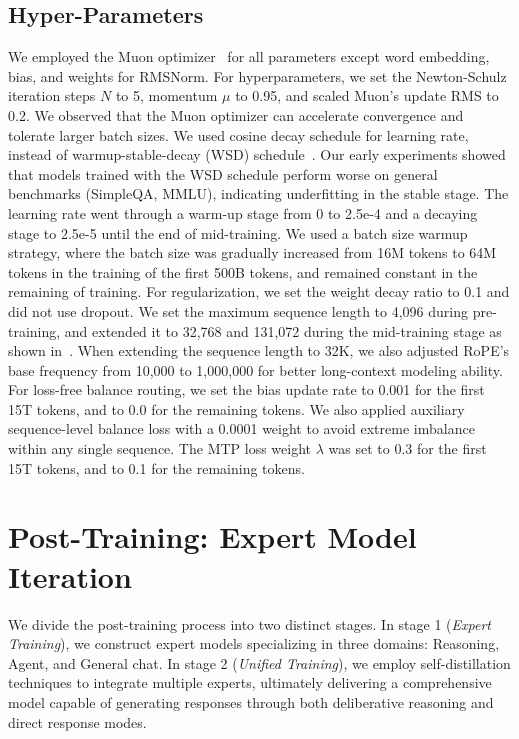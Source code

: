 \documentclass{article}
\theoremstyle{definition}
\begin{document}
\subsection{Hyper-Parameters}

We employed the Muon optimizer~\cite{jordan6muon,liu2025muon} for all parameters except word embedding, bias, and weights for RMSNorm. For hyperparameters, we set the Newton-Schulz iteration steps $N$ to 5, momentum $\mu$ to 0.95, and scaled Muon's update RMS to 0.2. We observed that the Muon optimizer can accelerate convergence and tolerate larger batch sizes. We used cosine decay schedule for learning rate, instead of warmup-stable-decay (WSD) schedule~\cite{huminicpm}. Our early experiments showed that models trained with the WSD schedule perform worse on general benchmarks (SimpleQA, MMLU), indicating underfitting in the stable stage. The learning rate went through a warm-up stage from 0 to 2.5e-4 and a decaying stage to 2.5e-5 until the end of mid-training. We used a batch size warmup strategy, where the batch size was gradually increased from 16M tokens to 64M tokens in the training of the first 500B tokens, and remained constant in the remaining of training. 
For regularization, we set the weight decay ratio to 0.1 and did not use dropout. We set the maximum sequence length to 4,096 during pre-training, and extended it to 32,768 and 131,072 during the mid-training stage as shown in~. When extending the sequence length to 32K, we also adjusted RoPE's base frequency from 10,000 to 1,000,000 for better long-context modeling ability. For loss-free balance routing, we set the bias update rate to 0.001 for the first 15T tokens, and to 0.0 for the remaining tokens. We also applied auxiliary sequence-level balance loss with a 0.0001 weight to avoid extreme imbalance within any single sequence. The MTP loss weight $\lambda$ was set to 0.3 for the first 15T tokens, and to 0.1 for the remaining tokens.

\section{Post-Training: Expert Model Iteration}

We divide the post-training process into two distinct stages. In stage 1 (\emph{Expert Training}), we construct expert models specializing in three domains: Reasoning, Agent, and General chat. In stage 2 (\emph{Unified Training}), we employ self-distillation techniques to integrate multiple experts, ultimately delivering a comprehensive model capable of generating responses through both deliberative reasoning and direct response modes.
\end{document}
